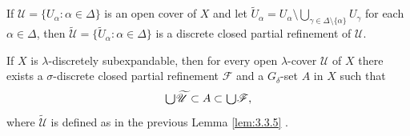\documentclass[ch3.tex]{subfiles}
\begin{document}
 {\lemma{\label{lem:3.3.5}}
If $\mathscr{U} = \{U_\alpha:  \alpha \in \Delta\}$ is an open cover of $X$ and let 
$\widetilde{U}_\alpha = U_\alpha \setminus \bigcup_{\gamma\in\Delta\setminus\{\alpha\}} U_\gamma$ 
for each $\alpha \in \Delta$, then $\widetilde{\mathscr{U}} = \{\widetilde{U}_\alpha:  \alpha \in \Delta\}$ 
is a discrete closed partial refinement of $\mathscr{U}$. \hfill\qedsymbol
}

 {\lemma{\label{lem:3.3.6}}
If $X$ is $\lambda$-discretely subexpandable, then for every open 
$\lambda$-cover $\mathscr{U}$ of $X$ there exists a $\sigma$-discrete closed partial refinement 
$\mathscr{F}$ and a $G_\delta$-set $A$ in $X$ such that 
$$\raisebox{-2pt}{\scalebox{1.5}{$\cup$}} \widetilde{\mathscr{U}} \subset A \subset \raisebox{-2pt}{\scalebox{1.5}{$\cup$}} \mathscr{F},$$
where $\widetilde{\mathscr{U}}$ is defined as in the previous Lemma \ref{lem:3.3.5} .
}
\end{document}
